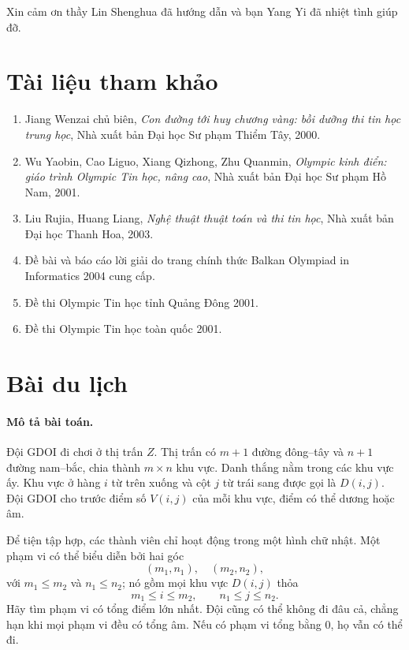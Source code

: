 \documentclass[11pt]{article}
\begin{document}
Xin cảm ơn thầy Lin Shenghua đã hướng dẫn và bạn Yang Yi đã nhiệt tình giúp
đỡ.

\section*{Tài liệu tham khảo}

\begin{enumerate}
  \item Jiang Wenzai chủ biên, \textit{Con đường tới huy chương vàng: bồi
  dưỡng thi tin học trung học}, Nhà xuất bản Đại học Sư phạm Thiểm Tây, 2000.
  \item Wu Yaobin, Cao Liguo, Xiang Qizhong, Zhu Quanmin,
  \textit{Olympic kinh điển: giáo trình Olympic Tin học, nâng cao}, Nhà xuất
  bản Đại học Sư phạm Hồ Nam, 2001.
  \item Liu Rujia, Huang Liang, \textit{Nghệ thuật thuật toán và thi tin học},
  Nhà xuất bản Đại học Thanh Hoa, 2003.
  \item Đề bài và báo cáo lời giải do trang chính thức Balkan Olympiad in
  Informatics 2004 cung cấp.
  \item Đề thi Olympic Tin học tỉnh Quảng Đông 2001.
  \item Đề thi Olympic Tin học toàn quốc 2001.
\end{enumerate}

\appendix
\section{Bài du lịch}

\paragraph{Mô tả bài toán.}
Đội GDOI đi chơi ở thị trấn $Z$. Thị trấn có $m+1$ đường đông--tây và
$n+1$ đường nam--bắc, chia thành $m\times n$ khu vực. Danh thắng nằm trong
các khu vực ấy. Khu vực ở hàng $i$ từ trên xuống và cột $j$ từ trái sang được
gọi là $D(i,j)$. Đội GDOI cho trước điểm số $V(i,j)$ của mỗi khu vực, điểm có
thể dương hoặc âm.

Để tiện tập hợp, các thành viên chỉ hoạt động trong một hình chữ nhật. Một
phạm vi có thể biểu diễn bởi hai góc
\[
  (m_1,n_1),\quad (m_2,n_2),
\]
với $m_1\le m_2$ và $n_1\le n_2$; nó gồm mọi khu vực $D(i,j)$ thỏa
\[
  m_1\le i\le m_2,\qquad n_1\le j\le n_2.
\]
Hãy tìm phạm vi có tổng điểm lớn nhất. Đội cũng có thể không đi đâu cả, chẳng
hạn khi mọi phạm vi đều có tổng âm. Nếu có phạm vi tổng bằng $0$, họ vẫn có
thể đi.
\end{document}
